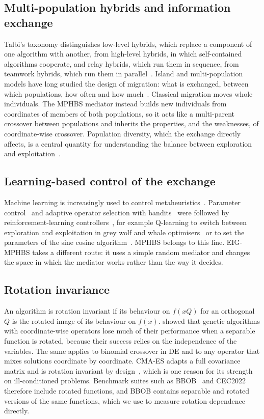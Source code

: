 \documentclass[preprint,12pt,authoryear]{elsarticle}
\theoremstyle{remark}
\begin{document}
\subsection{Multi-population hybrids and information exchange}
Talbi's taxonomy distinguishes low-level hybrids, which replace a component of one algorithm with another, from
high-level hybrids, in which self-contained algorithms cooperate, and relay hybrids, which run them in sequence, from
teamwork hybrids, which run them in parallel~\citep{talbi2002taxonomy,blum2011hybrid}. Island and multi-population
models have long studied the design of migration: what is exchanged, between which populations, how often and how
much~\citep{alba2002parallel,ma2019multipop}. Classical migration moves whole individuals. The MPHBS mediator instead
builds new individuals from coordinates of members of both populations, so it acts like a multi-parent crossover between
populations and inherits the properties, and the weaknesses, of coordinate-wise crossover. Population diversity, which
the exchange directly affects, is a central quantity for understanding the balance between exploration and
exploitation~\citep{crepinsek2013exploration,squillero2016diversity,morales2020balance}.

\subsection{Learning-based control of the exchange}
Machine learning is increasingly used to control metaheuristics~\citep{talbi2021ml}. Parameter
control~\citep{karafotias2015parameter} and adaptive operator selection with bandits~\citep{fialho2010bandit} were
followed by reinforcement-learning controllers~\citep{drugan2019rl,song2024rlea}, for example Q-learning to switch
between exploration and exploitation in grey wolf and whale optimisers~\citep{seyyedabbasi2021rl} or to set the
parameters of the sine cosine algorithm~\citep{hamad2022qlesca}. MPHBS belongs to this line. EIG-MPHBS takes a
different route: it uses a simple random mediator and changes the space in which the mediator works rather than the
way it decides.

\subsection{Rotation invariance}
An algorithm is rotation invariant if its behaviour on $f(xQ)$ for an orthogonal $Q$ is the rotated image of its
behaviour on $f(x)$. \citet{salomon1996rotation} showed that genetic algorithms with coordinate-wise operators lose much
of their performance when a separable function is rotated, because their success relies on the independence of the
variables. The same applies to binomial crossover in DE and to any operator that mixes solutions coordinate by
coordinate. CMA-ES adapts a full covariance matrix and is rotation invariant by design~\citep{hansen2001cma}, which is
one reason for its strength on ill-conditioned problems. Benchmark suites such as BBOB~\citep{hansen2009bbob,
hansen2021coco} and CEC2022~\citep{kumar2021cec2022} therefore include rotated functions, and BBOB contains separable and
rotated versions of the same functions, which we use to measure rotation dependence directly.
\end{document}
